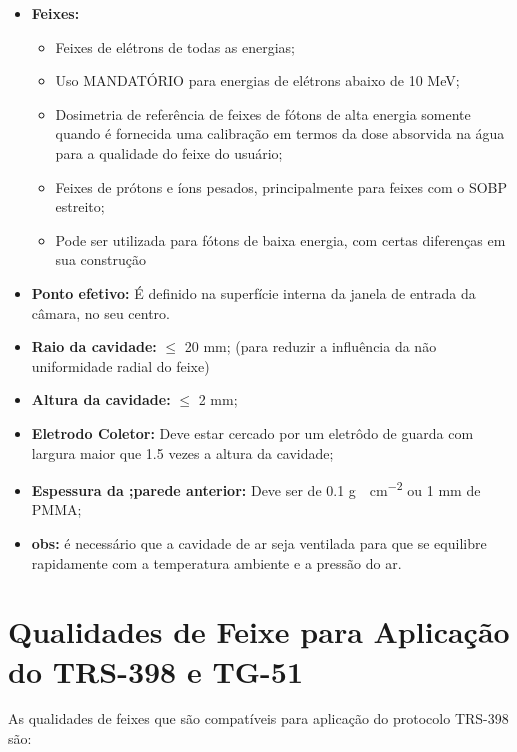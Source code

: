 \documentclass[11pt,a4paper]{article}
\newcounter{exemplo}
\begin{document}
	\begin{exemplo}
		\begin{itemize}[label=\textcolor{CarnationPink}{$\blacktriangleright$}]
			\item \textbf{Feixes:} 
				\begin{itemize}[label=\textcolor{CarnationPink}{$\star$}]
					\item Feixes de elétrons de todas as energias;
					\item Uso MANDATÓRIO para energias de elétrons abaixo de 10 MeV;
					\item Dosimetria de referência de feixes de fótons de alta energia somente quando é fornecida uma calibração em termos da dose absorvida na água para a qualidade do feixe do usuário;
					\item Feixes de prótons e íons pesados, principalmente para feixes com o SOBP estreito;
					\item Pode ser utilizada para fótons de baixa energia, com certas diferenças em sua construção
				\end{itemize}
			\item \textbf{Ponto efetivo:} É definido na superfície interna da janela de entrada da câmara, no seu centro.
			\item \textbf{Raio da cavidade: } $\leq$ 20 mm; (para reduzir a influência da não uniformidade radial do feixe)
			\item \textbf{Altura da cavidade:}  $\leq$ 2 mm;
			\item \textbf{Eletrodo Coletor:} Deve estar cercado por um eletrôdo de guarda com largura maior que 1.5 vezes a altura da cavidade;
			\item \textbf{Espessura da ;parede anterior:} Deve ser de 0.1 \unit{g \cdot cm^{-2}} ou 1 mm de PMMA;
			\item \textbf{obs:} é necessário que a cavidade de ar seja ventilada para que se equilibre rapidamente com a temperatura ambiente e a pressão do ar.
		\end{itemize}		
	\end{exemplo}

	\section{Qualidades de Feixe para Aplicação do TRS-398 e TG-51}

	As qualidades de feixes que são compatíveis para aplicação do protocolo TRS-398 são:
\end{document}
